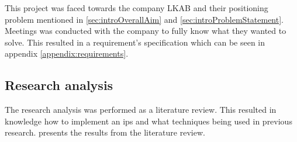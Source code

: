 \bigskip

This project was faced towards the company LKAB and their positioning problem mentioned in \cref{sec:introOverallAim} and \ref{sec:introProblemStatement}.
Meetings was conducted with the company to fully know what they wanted to solve.
This resulted in a requirement's specification which can be seen in appendix \ref{appendix:requirements}.

\subsection{Research analysis}\label{sec:methodResearchAnalysis}
The research analysis was performed as a literature review. 
This resulted in knowledge how to implement an \acrshort{ips} and what techniques being used in previous research.
 presents the results from the literature review.
